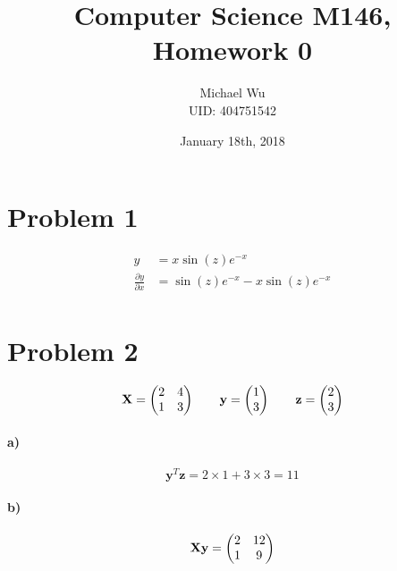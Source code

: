\documentclass[12pt]{article}
\begin{document}
\title{Computer Science M146, Homework 0}
\date{January 18th, 2018}
\author{Michael Wu\\UID: 404751542}
\maketitle

\section*{Problem 1}

\begin{align*}
        y&=x\sin(z)e^{-x}\\
        \frac{\partial y}{\partial x}&=\sin(z)e^{-x}-x\sin(z)e^{-x}\\
\end{align*}

\section*{Problem 2}

\[\mathbf{X}=\left(
        \begin{array}{@{}cc@{}}
                2&4\\
                1&3
        \end{array}
\right)\qquad
\mathbf{y}=\left(
        \begin{array}{@{}c@{}}
                1\\
                3
        \end{array}
\right)\qquad
\mathbf{z}=\left(
        \begin{array}{@{}c@{}}
                2\\
                3
        \end{array}
\right)
\]

\paragraph{a)}

\[\mathbf{y}^T\mathbf{z}=2\times 1+ 3\times 3 = 11\]

\paragraph{b)}

\[\mathbf{X}\mathbf{y}=\left(
        \begin{array}{@{}cc@{}}
                2&12\\
                1&9
        \end{array}
\right)\]
\end{document}
